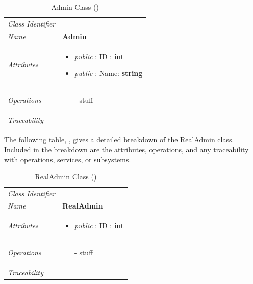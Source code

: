 \documentclass[12pt,letterpaper]{article}
\begin{document}
\begin{table}[H]
    \caption{Admin Class ()} 
	\begin{tabu} to 
		\toprule
		Class Identifier &  \\
		Name & {\bf Admin} \\
		Attributes & 
		\begin{minipage}[t]{\linewidth}
		    \begin{itemize}
		        \item \textit{public} : ID : {\bf int}
		        \item \textit{public} : Name: {\bf string}
			\end{itemize}
	    \end{minipage} \\

		Operations &
		\begin{minipage}[t]{\linewidth}
			\begin{enumerate}
			    \item[-] stuff
	        \end{enumerate}
	    \end{minipage} \\
	    	Traceability & \\
		\toprule
	\end{tabu}
\end{table}

The following table, , gives a detailed breakdown of the RealAdmin class. Included in the breakdown are the attributes, operations, and any traceability with operations, services, or subsystems.

\begin{table}[H]
    \caption{RealAdmin Class ()} 
	\begin{tabu} to 
		\toprule
		Class Identifier &  \\
		Name & {\bf RealAdmin} \\
		Attributes & 
		\begin{minipage}[t]{\linewidth}
		    \begin{itemize}
		        \item \textit{public} : ID : \bf{int}
			\end{itemize}
	    \end{minipage} \\

		Operations &
		\begin{minipage}[t]{\linewidth}
			\begin{enumerate}
			    \item[-] stuff
	        \end{enumerate}
	    \end{minipage} \\
	    	Traceability & \\
		\toprule
	\end{tabu}
\end{table}
\end{document}
